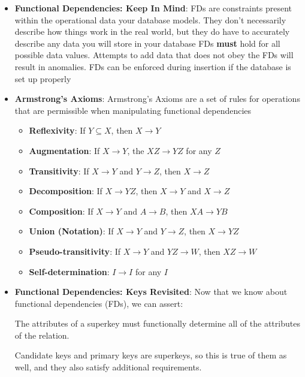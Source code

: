 \documentclass{report}
\begin{document}
\begin{itemize}
\begin{itemize}
            \end{itemize}
        \item \textbf{Functional Dependencies: Keep In Mind}: FDs are constraints present within the operational data your database models. They don’t necessarily describe how things work in the real world, but they do have to accurately describe any data you will store in your database
            \bigbreak \noindent 
            FDs \textbf{must} hold for all possible data values. Attempts to add data that does not obey the FDs will result in anomalies.
            \bigbreak \noindent 
            FDs can be enforced during insertion if the database is set up properly
        \item \textbf{Armstrong’s Axioms}: Armstrong’s Axioms are a set of rules for operations that are permissible when manipulating functional dependencies
            \begin{itemize}
                \item \textbf{Reflexivity}: If $Y \subseteq X$, then $X \to Y $
                \item \textbf{Augmentation}: If $X \to Y$, the $XZ \to YZ$ for any $Z$
                \item \textbf{Transitivity}: If $X \to Y$ and $Y \to Z$, then $X \to Z $
                \item \textbf{Decomposition}: If $X \to YZ$, then $X \to Y$ and $X \to Z $
                \item \textbf{Composition}: If $X \to Y$ and $A \to B$, then $XA \to YB $
                \item \textbf{Union (Notation)}: If $X\to Y$ and $Y \to Z$, then $X \to YZ $
                \item \textbf{Pseudo-transitivity}: If $X \to Y$ and $YZ \to W$, then $XZ \to W $
                \item \textbf{Self-determination}: $I \to I $ for any $I$
            \end{itemize}
        \item \textbf{Functional Dependencies: Keys Revisited}: Now that we know about functional dependencies (FDs), we can assert:
            \bigbreak \noindent 
            \begin{center}
                The attributes of a superkey must functionally determine all of the attributes of the relation.
            \end{center}
            \bigbreak \noindent 
            Candidate keys and primary keys are superkeys, so this is true of them as well, and they also satisfy additional requirements.

\end{itemize}
\end{document}
